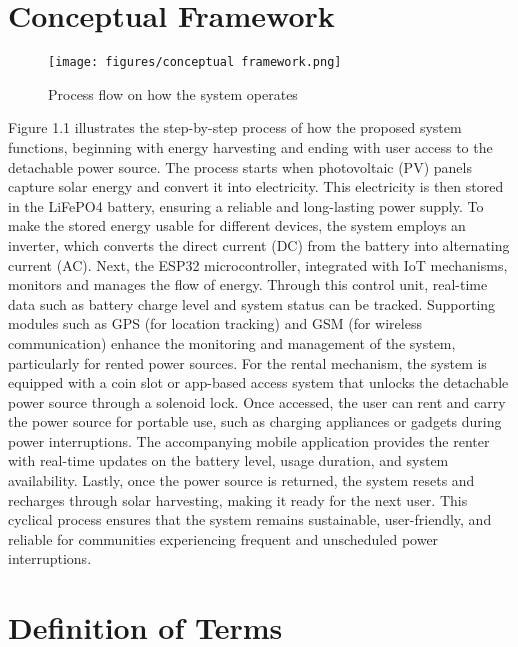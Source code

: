{\section{Conceptual Framework}

\begin{figure}[H]
	\centering
	\caption{Process flow on how the system operates}
	\label{fig:conceptualfra}
	\texttt{[image: figures/conceptual framework.png]}
\end{figure}


Figure 1.1 illustrates the step-by-step process of how the proposed system functions, beginning with energy harvesting and ending with user access to the detachable power source. The process starts when photovoltaic (PV) panels capture solar energy and convert it into electricity. This electricity is then stored in the LiFePO4 battery, ensuring a reliable and long-lasting power supply. To make the stored energy usable for different devices, the system employs an inverter, which converts the direct current (DC) from the battery into alternating current (AC). Next, the ESP32 microcontroller, integrated with IoT mechanisms, monitors and manages the flow of energy. Through this control unit, real-time data such as battery charge level and system status can be tracked. Supporting modules such as GPS (for location tracking) and GSM (for wireless communication) enhance the monitoring and management of the system, particularly for rented power sources. For the rental mechanism, the system is equipped with a coin slot or app-based access system that unlocks the detachable power source through a solenoid lock. Once accessed, the user can rent and carry the power source for portable use, such as charging appliances or gadgets during power interruptions. The accompanying mobile application provides the renter with real-time updates on the battery level, usage duration, and system availability. Lastly, once the power source is returned, the system resets and recharges through solar harvesting, making it ready for the next user. This cyclical process ensures that the system remains sustainable, user-friendly, and reliable for communities experiencing frequent and unscheduled power interruptions.

\section{Definition of Terms}

\begin{description}


\end{description}}
